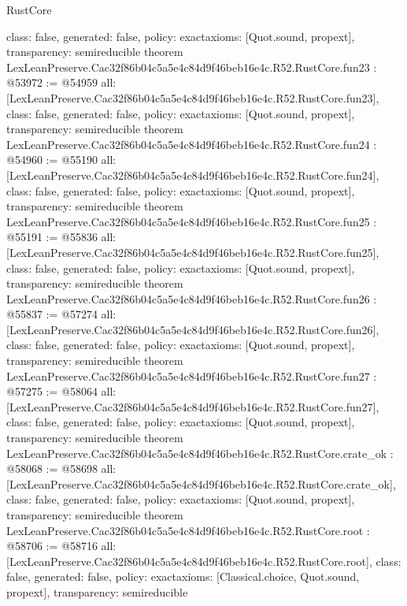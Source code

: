 \begin{lexlean}{RustCore}
\begin{coremodule}
{  class: false,
  generated: false,
  policy: exact{axioms: [Quot.sound, propext]},
  transparency: semireducible
}
theorem LexLeanPreserve.Cac32f86b04c5a5e4c84d9f46beb16e4c.R52.RustCore.fun23 : @53972 := @54959 {
  all: [LexLeanPreserve.Cac32f86b04c5a5e4c84d9f46beb16e4c.R52.RustCore.fun23],
  class: false,
  generated: false,
  policy: exact{axioms: [Quot.sound, propext]},
  transparency: semireducible
}
theorem LexLeanPreserve.Cac32f86b04c5a5e4c84d9f46beb16e4c.R52.RustCore.fun24 : @54960 := @55190 {
  all: [LexLeanPreserve.Cac32f86b04c5a5e4c84d9f46beb16e4c.R52.RustCore.fun24],
  class: false,
  generated: false,
  policy: exact{axioms: [Quot.sound, propext]},
  transparency: semireducible
}
theorem LexLeanPreserve.Cac32f86b04c5a5e4c84d9f46beb16e4c.R52.RustCore.fun25 : @55191 := @55836 {
  all: [LexLeanPreserve.Cac32f86b04c5a5e4c84d9f46beb16e4c.R52.RustCore.fun25],
  class: false,
  generated: false,
  policy: exact{axioms: [Quot.sound, propext]},
  transparency: semireducible
}
theorem LexLeanPreserve.Cac32f86b04c5a5e4c84d9f46beb16e4c.R52.RustCore.fun26 : @55837 := @57274 {
  all: [LexLeanPreserve.Cac32f86b04c5a5e4c84d9f46beb16e4c.R52.RustCore.fun26],
  class: false,
  generated: false,
  policy: exact{axioms: [Quot.sound, propext]},
  transparency: semireducible
}
theorem LexLeanPreserve.Cac32f86b04c5a5e4c84d9f46beb16e4c.R52.RustCore.fun27 : @57275 := @58064 {
  all: [LexLeanPreserve.Cac32f86b04c5a5e4c84d9f46beb16e4c.R52.RustCore.fun27],
  class: false,
  generated: false,
  policy: exact{axioms: [Quot.sound, propext]},
  transparency: semireducible
}
theorem LexLeanPreserve.Cac32f86b04c5a5e4c84d9f46beb16e4c.R52.RustCore.crate_ok : @58068 := @58698 {
  all: [LexLeanPreserve.Cac32f86b04c5a5e4c84d9f46beb16e4c.R52.RustCore.crate_ok],
  class: false,
  generated: false,
  policy: exact{axioms: [Quot.sound, propext]},
  transparency: semireducible
}
theorem LexLeanPreserve.Cac32f86b04c5a5e4c84d9f46beb16e4c.R52.RustCore.root : @58706 := @58716 {
  all: [LexLeanPreserve.Cac32f86b04c5a5e4c84d9f46beb16e4c.R52.RustCore.root],
  class: false,
  generated: false,
  policy: exact{axioms: [Classical.choice, Quot.sound, propext]},
  transparency: semireducible
}


\end{coremodule}
\end{lexlean}
